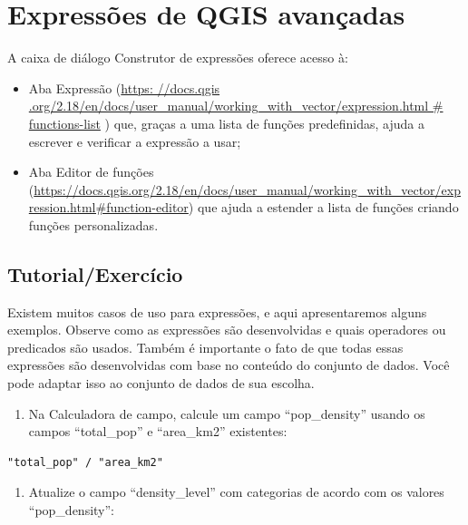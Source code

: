 \documentclass[
]{krantz}
\providecommand{\tightlist}{%
  \setlength{\itemsep}{0pt}\setlength{\parskip}{0pt}}
\begin{document}
\hypertarget{expressuxf5es-de-qgis-avanuxe7adas}{%
\section{Expressões de QGIS avançadas}\label{expressuxf5es-de-qgis-avanuxe7adas}}

A caixa de diálogo Construtor de expressões oferece acesso à:

\begin{itemize}
\tightlist
\item
  Aba Expressão (\href{https://docs.qgis.org/2.18/en/docs/user_manual/working_with_vector/expression.html\#functions-list}{https: //docs.qgis .org/2.18/en/docs/user\_manual/working\_with\_vector/expression.html \# functions-list} ) que, graças a uma lista de funções predefinidas, ajuda a escrever e verificar a expressão a usar;
\item
  Aba Editor de funções (\href{https://docs.qgis.org/2.18/en/docs\%20/user_manual/working_with_vector/expression.html\#function-editor}{https://docs.qgis.org/2.18/en/docs/user\_manual/working\_with\_vector/expression.html\#function-editor}) que ajuda a estender a lista de funções criando funções personalizadas.
\end{itemize}

\hypertarget{tutorialexercuxedcio-6}{%
\subsection{Tutorial/Exercício}\label{tutorialexercuxedcio-6}}

Existem muitos casos de uso para expressões, e aqui apresentaremos alguns exemplos. Observe como as expressões são desenvolvidas e quais operadores ou predicados são usados. Também é importante o fato de que todas essas expressões são desenvolvidas com base no conteúdo do conjunto de dados. Você pode adaptar isso ao conjunto de dados de sua escolha.

\begin{enumerate}
\def\labelenumi{\arabic{enumi}.}
\tightlist
\item
  Na Calculadora de campo, calcule um campo ``pop\_density'' usando os campos ``total\_pop'' e ``area\_km2'' existentes:
\end{enumerate}

\begin{verbatim}
"total_pop" / "area_km2"
\end{verbatim}

\begin{enumerate}
\def\labelenumi{\arabic{enumi}.}
\setcounter{enumi}{1}
\tightlist
\item
  Atualize o campo ``density\_level'' com categorias de acordo com os valores ``pop\_density'':
\end{enumerate}
\end{document}
